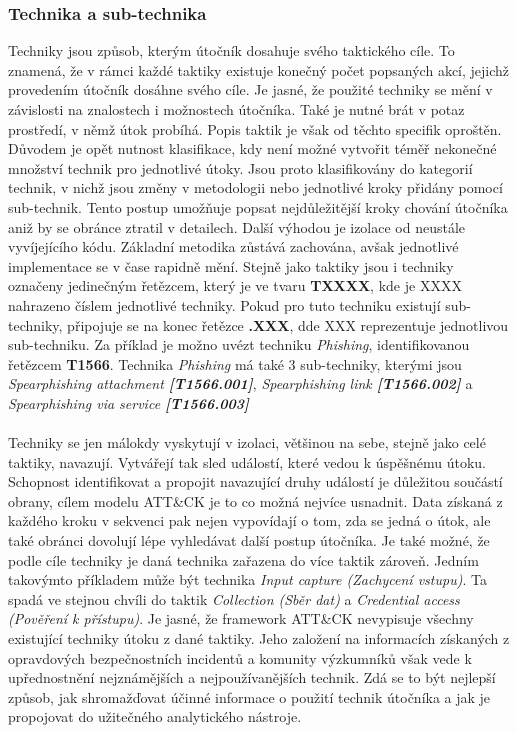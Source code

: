 \subsubsection{Technika a sub-technika}
Techniky jsou způsob, kterým útočník dosahuje svého taktického cíle.
To znamená, že v rámci každé taktiky existuje konečný počet popsaných akcí, jejichž provedením útočník dosáhne svého cíle.
Je jasné, že použité techniky se mění v závislosti na znalostech i možnostech útočníka.
Také je nutné brát v potaz prostředí, v němž útok probíhá.
Popis taktik je však od těchto specifik oproštěn.
Důvodem je opět nutnost klasifikace, kdy není možné vytvořit téměř nekonečné množství technik pro jednotlivé útoky.
Jsou proto klasifikovány do kategorií technik, v nichž jsou změny v metodologii nebo jednotlivé kroky přidány pomocí sub-technik.
Tento postup umožňuje popsat nejdůležitější kroky chování útočníka aniž by se obránce ztratil v detailech.
Další výhodou je izolace od neustále vyvíjejícího kódu.
Základní metodika zůstává zachována, avšak jednotlivé implementace se v čase rapidně mění.
Stejně jako taktiky jsou i techniky označeny jedinečným řetězcem, který je ve tvaru \textbf{TXXXX}, kde je XXXX nahrazeno číslem jednotlivé techniky.
Pokud pro tuto techniku existují sub-techniky, připojuje se na konec řetězce \textbf{.XXX}, dde XXX reprezentuje jednotlivou sub-techniku.
Za příklad je možno uvézt techniku \textit{Phishing}, identifikovanou řetězcem \textbf{T1566}.
Technika \textit{Phishing} má také 3 sub-techniky, kterými jsou \textit{Spearphishing attachment \textbf{[T1566.001]}}, \textit{Spearphishing link \textbf{[T1566.002]}} a \textit{Spearphishing via service \textbf{[T1566.003]}}

\paragraph{}
Techniky se jen málokdy vyskytují v izolaci, většinou na sebe, stejně jako celé taktiky, navazují.
Vytvářejí tak sled událostí, které vedou k úspěšnému útoku.
Schopnost identifikovat a propojit navazující druhy událostí je důležitou součástí obrany, cílem modelu ATT\&CK je to co možná nejvíce usnadnit.
Data získaná z každého kroku v sekvenci pak nejen vypovídají o tom, zda se jedná o útok, ale také obránci dovolují lépe vyhledávat další postup útočníka.
Je také možné, že podle cíle techniky je daná technika zařazena do více taktik zároveň.
Jedním takovýmto příkladem může být technika \textit{Input capture (Zachycení vstupu)}.
Ta spadá ve stejnou chvíli do taktik \textit{Collection (Sběr dat)} a \textit{Credential access (Pověření k přístupu)}.
Je jasné, že framework ATT\&CK nevypisuje všechny existující techniky útoku z dané taktiky.
Jeho založení na informacích získaných z opravdových bezpečnostních incidentů a komunity výzkumníků však vede k upřednostnění nejznámějších a nejpoužívanějších technik.
Zdá se to být nejlepší způsob, jak shromažďovat účinné informace o použití technik útočníka a jak je propojovat do užitečného analytického nástroje.\cite{Mitre_finding_cyber_threats, mitre_attack_framework}

